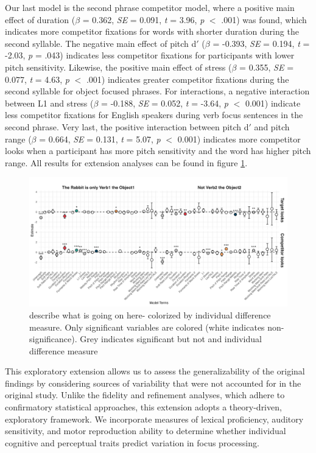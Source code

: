 Our last model is the second phrase competitor model, where a positive main effect of duration ($\beta$ = 0.362, \textit{SE} = 0.091, \textit{t} = 3.96, \textit{p} $<$ .001) was found, which indicates more competitor fixations for words with shorter duration during the second syllable. The negative main effect of pitch d$'$ ($\beta$ = -0.393, \textit{SE} = 0.194, \textit{t} = -2.03, \textit{p} = .043) indicates less competitor fixations for participants with lower pitch sensitivity. Likewise, the positive main effect of stress ($\beta$ = 0.355, \textit{SE} = 0.077, \textit{t} = 4.63, \textit{p} $<$ .001) indicates greater competitor fixations during the second syllable for object focused phrases. For interactions, a negative interaction between L1 and stress ($\beta$ = -0.188, \textit{SE} = 0.052, \textit{t} = -3.64, \textit{p} $<$ 0.001) indicate less competitor fixations for English speakers during verb focus sentences in the second phrase. Very last, the positive interaction between pitch d$'$ and pitch range ($\beta$ = 0.664, \textit{SE} = 0.131, \textit{t} = 5.07, \textit{p} $<$ 0.001) indicates more competitor looks when a participant has more pitch sensitivity and the word has higher pitch range. All results for extension analyses can be found in figure \ref{fig:id_gam_mod_out}.

\begin{figure}[H]  %
    \centering
    \includegraphics[width=\textwidth,height=\textheight,keepaspectratio]{viz/id_gam_mod_out.png}
    \caption{describe what is going on here- colorized by individual difference measure. Only significant variables are colored (white indicates non-significance). Grey indicates significant but not and individual difference measure}
    \label{fig:id_gam_mod_out}
\end{figure}

This exploratory extension allows us to assess the generalizability of the original findings by considering sources of variability that were not accounted for in the original study. Unlike the fidelity and refinement analyses, which adhere to confirmatory statistical approaches, this extension adopts a theory-driven, exploratory framework. We incorporate measures of lexical proficiency, auditory sensitivity, and motor reproduction ability to determine whether individual cognitive and perceptual traits predict variation in focus processing.

